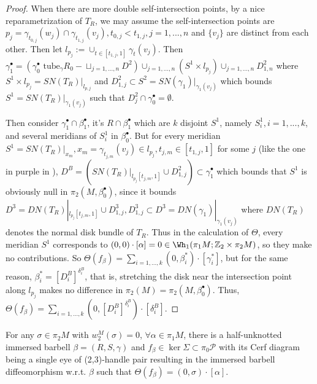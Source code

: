 \begin{proof}
    When there are more double self-intersection points, by a nice reparametrization of $T_R$, we may assume the self-intersection points are $p_j=\gamma_{t_{0,j}}(w_j)\cap \gamma_{t_{1,j}}(v_j),t_{0,j}<t_{1,j}, j=1,...,n$ and $\{v_j\}$ are distinct from each other. Then let $l_{p_j}:=\cup_{t\in [t_{1,j}, 1]} \gamma_t(v_j)$. Then $\gamma_1^\bullet=(\gamma_0^\bullet\text{ tube}_\gamma R_0-\sqcup _{j=1,...,n}D^2) \cup_{j=1,...,n} (S^1\times l_{p_j}) \cup_{j=1,...,n} D_{1,n}^2$ where $S^1\times l_{p_j}=SN(T_R)|_{l_{p,j}}$ and $D_{1,j}^2\subset S^2=SN(\gamma_1)|_{\gamma_1(v_j)}$ which bounds $S^1=SN(T_R)|_{\gamma_1(v_j)}$ such that $D_j^2\cap \gamma_0^\bullet=\emptyset$.

    Then consider $\gamma_1^\bullet\cap \beta_1^\bullet$, it's $R\cap \beta_1^\bullet$ which are $k$ disjoint $S^1$, namely $S_i^1, i=1,...,k$, and several meridians of $S_i^1$ in $\beta_0^\bullet$. But for every meridian $S^1=SN(T_R)|_{x_m}, x_m=\gamma_{t_{j,m}}(v_j)\in l_{p_j}, t_{j,m}\in [t_{1,j},1]$ for some $j$ (like the one in purple in ), $D^B=(SN(T_R)|_{l_{p_j}[t_{j,m},1]} \cup D_{1,j}^2)\subset \gamma_1^\bullet$ which bounds that $S^1$ is obviously null in $\pi_2 (M,\beta_0^\bullet)$, since it bounds $D^3=DN(T_R)|_{l_{p_j}[t_{j,m}, 1]}\cup D_{1,j}^3, D_{1,j}^3\subset D^3=DN(\gamma_1)|_{\gamma_1(v_j)}$ where $DN(T_R)$ denotes the normal disk bundle of $T_R$. Thus in the calculation of $\Theta$, every meridian $S^1$ corresponds to $(0,0)\cdot[\alpha]=0\in \Wh_1(\pi_1 M; \mathbb{Z}_2\times \pi_2 M)$, so they make no contributions. So $\Theta(f_\beta)=\sum_{i=1,...,k} (0, \beta_i^*)\cdot [\gamma_i^*]$, but for the same reason, $\beta_i^*=[D_i^B]^{\delta_i^B}$, that is, stretching the disk near the intersection point along $l_{p_j}$ makes no difference in $\pi_2 (M)=\pi_2(M,\beta_0^\bullet)$. Thus, $\Theta(f_\beta)=\sum_{i=1,...,k} (0, [D^B_i]^{\delta_i^B})\cdot [\delta_i^B]$.
\end{proof}

\begin{corollary} \label{cor:realize-without-odd-sphere}
    For any $\sigma\in \pi_2 M$ with $w_2^M(\sigma)=0$, $\forall \alpha\in \pi_1 M$, there is a half-unknotted immersed barbell $\beta=(R, S, \gamma)$ and $f_\beta\in \ker\Sigma\subset \pi_0\mathcal{P}$ with its Cerf diagram being a single eye of (2,3)-handle pair resulting in the immersed barbell diffeomorphism w.r.t. $\beta$ such that $\Theta(f_\beta)=(0,\sigma)\cdot [\alpha]$.
\end{corollary}

